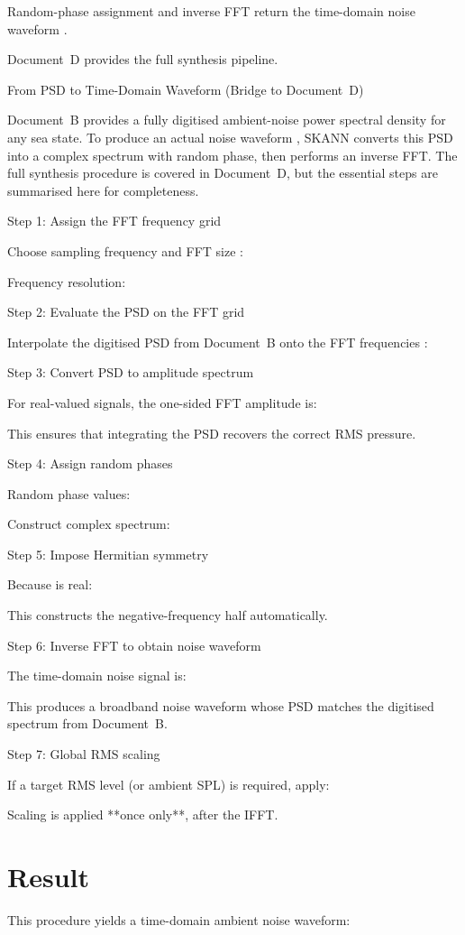 \documentclass[12pt]{article}
\begin{document}
Random-phase assignment and inverse FFT return the time-domain noise waveform .

Document D provides the full synthesis pipeline.

From PSD to Time-Domain Waveform (Bridge to Document D)

Document B provides a fully digitised ambient-noise power spectral density  for any sea state. To produce an actual noise waveform , SKANN converts this PSD into a complex spectrum with random phase, then performs an inverse FFT. The full synthesis procedure is covered in Document D, but the essential steps are summarised here for completeness.

Step 1: Assign the FFT frequency grid

Choose sampling frequency  and FFT size :


Frequency resolution:


Step 2: Evaluate the PSD on the FFT grid

Interpolate the digitised PSD  from Document B onto the FFT frequencies :


Step 3: Convert PSD to amplitude spectrum

For real-valued signals, the one-sided FFT amplitude is:


This ensures that integrating the PSD recovers the correct RMS pressure.

Step 4: Assign random phases

Random phase values:


Construct complex spectrum:


Step 5: Impose Hermitian symmetry

Because  is real:


This constructs the negative-frequency half automatically.

Step 6: Inverse FFT to obtain noise waveform

The time-domain noise signal is:


This produces a broadband noise waveform whose PSD matches the digitised spectrum from Document B.

Step 7: Global RMS scaling

If a target RMS level (or ambient SPL) is required, apply:


Scaling is applied **once only**, after the IFFT.

\section*{Result}
This procedure yields a time-domain ambient noise waveform:
\end{document}
